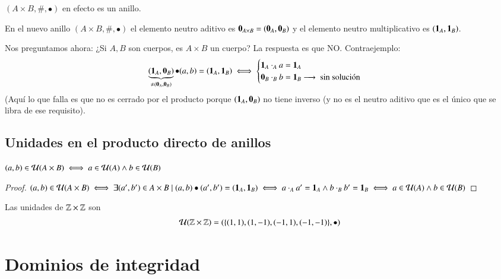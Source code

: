 \begin{pro}
	$(A\times B, \#, \bullet)$ en efecto es un anillo.
\end{pro}

\begin{obs}
	En el nuevo anillo $(A\times B, \#, \bullet)$ el elemento neutro aditivo es $\mathbf{0}_{A\times B} = (\mathbf{0}_A, \mathbf{0}_B)$ y el elemento neutro multiplicativo es $(\mathbf{1}_A, \mathbf{1}_B)$.
\end{obs}

\begin{obs}
	Nos preguntamos ahora: ¿Si $A, B$ son cuerpos, es $A \times B$ un cuerpo? La respuesta es que NO. Contraejemplo:
	\begin{align*}
	\underbrace{(\mathbf{1}_A,\mathbf{0}_B)}_{\neq (\mathbf{0}_A, \mathbf{0}_B)} \bullet (a,b) = (\mathbf{1}_A, \mathbf{1}_B) \iff \begin{cases}
	\mathbf{1}_A \cdot_A a = \mathbf{1}_A \\
	\mathbf{0}_B \cdot_B b = \mathbf{1}_B \longrightarrow\text{ sin solución }
	\end{cases}
	\end{align*}
	(Aquí lo que falla es que no es cerrado por el producto porque $(\mathbf{1}_A, \mathbf{0}_B)$ no tiene inverso (y no es el neutro aditivo que es el único que se libra de ese requisito).
\end{obs}

\subsection{Unidades en el producto directo de anillos}

\begin{pro}
	\label{pro:udsproductodirectoanillos}
	$(a,b) \in \mathcal{U}(A \times B) \iff a \in \mathcal{U}(A) \land b \in \mathcal{U}(B)$
\end{pro}

\begin{proof}
	$(a,b) \in \mathcal{U}(A \times B) \iff \exists (a',b') \in A\times B \mid (a,b) \bullet (a', b') = (\mathbf{1}_A, \mathbf{1}_B) \iff a\cdot_A a' = \mathbf{1}_A \land b\cdot_B b' = \mathbf{1}_B \iff a \in \mathcal{U}(A) \land b \in \mathcal{U}(B)$
\end{proof}

\begin{ej}
	Las unidades de $\mathbb{Z} \times \mathbb{Z}$ son
	\begin{align*}
	\mathcal{U}(\mathbb{Z} \times \mathbb{Z}) = (\{(1,1), (1,-1), (-1,1), (-1,-1)\}, \bullet)
	\end{align*}
\end{ej}


\section{Dominios de integridad}

